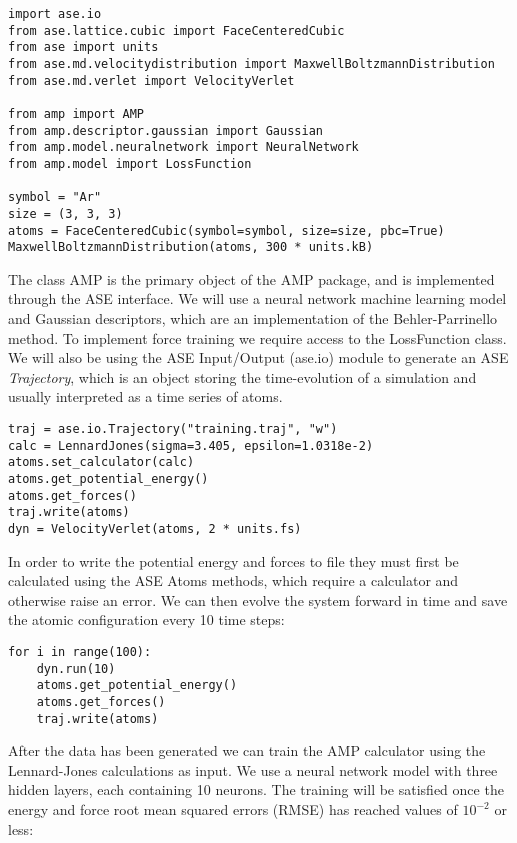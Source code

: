 \begin{verbatim}
import ase.io
from ase.lattice.cubic import FaceCenteredCubic
from ase import units
from ase.md.velocitydistribution import MaxwellBoltzmannDistribution
from ase.md.verlet import VelocityVerlet

from amp import AMP
from amp.descriptor.gaussian import Gaussian
from amp.model.neuralnetwork import NeuralNetwork
from amp.model import LossFunction

symbol = "Ar"
size = (3, 3, 3)
atoms = FaceCenteredCubic(symbol=symbol, size=size, pbc=True)
MaxwellBoltzmannDistribution(atoms, 300 * units.kB)
\end{verbatim}

The class AMP is the primary object of the AMP package,
and is implemented through the ASE interface.
We will use a neural network machine learning model
and Gaussian descriptors, which are an implementation of the
Behler-Parrinello method. To implement force training we require
access to the LossFunction class.
We will also be using the ASE Input/Output (ase.io) module to generate an
ASE \textit{Trajectory}, which is an object
storing the time-evolution of a simulation and usually interpreted
as a time series of atoms.

\begin{verbatim}
traj = ase.io.Trajectory("training.traj", "w")
calc = LennardJones(sigma=3.405, epsilon=1.0318e-2)
atoms.set_calculator(calc)
atoms.get_potential_energy()
atoms.get_forces()
traj.write(atoms)
dyn = VelocityVerlet(atoms, 2 * units.fs)
\end{verbatim}

In order to write the potential energy and forces to file
they must first be calculated using the ASE Atoms methods,
which require a calculator and otherwise raise an error.
We can then evolve the system forward in time
and save the atomic configuration every 10 time steps:

\begin{verbatim}
for i in range(100):
    dyn.run(10)
    atoms.get_potential_energy()
    atoms.get_forces()
    traj.write(atoms)
\end{verbatim}

After the data has been generated we can train the AMP calculator
using the Lennard-Jones calculations as input. 
We use a neural network model with three hidden layers,
each containing 10 neurons.
The training
will be satisfied once the energy and force root mean squared errors (RMSE)
has reached values of $10^{-2}$ or less:

